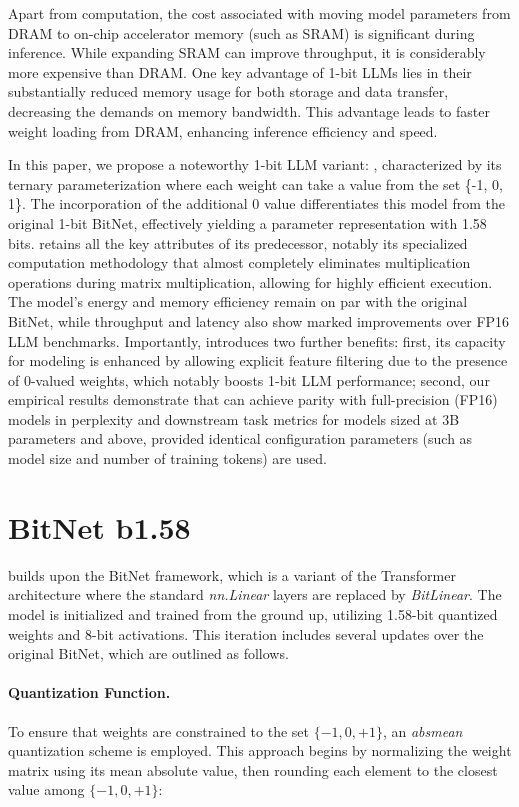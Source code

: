 Apart from computation, the cost associated with moving model parameters from DRAM to on-chip accelerator memory (such as SRAM) is significant during inference. While expanding SRAM can improve throughput, it is considerably more expensive than DRAM. One key advantage of 1-bit LLMs lies in their substantially reduced memory usage for both storage and data transfer, decreasing the demands on memory bandwidth. This advantage leads to faster weight loading from DRAM, enhancing inference efficiency and speed.

In this paper, we propose a noteworthy 1-bit LLM variant: \textbf{}, characterized by its ternary parameterization where each weight can take a value from the set \{-1, 0, 1\}. The incorporation of the additional 0 value differentiates this model from the original 1-bit BitNet, effectively yielding a parameter representation with 1.58 bits.  retains all the key attributes of its predecessor, notably its specialized computation methodology that almost completely eliminates multiplication operations during matrix multiplication, allowing for highly efficient execution. The model’s energy and memory efficiency remain on par with the original BitNet, while throughput and latency also show marked improvements over FP16 LLM benchmarks. Importantly,  introduces two further benefits: first, its capacity for modeling is enhanced by allowing explicit feature filtering due to the presence of 0-valued weights, which notably boosts 1-bit LLM performance; second, our empirical results demonstrate that  can achieve parity with full-precision (FP16) models in perplexity and downstream task metrics for models sized at 3B parameters and above, provided identical configuration parameters (such as model size and number of training tokens) are used.

\section{BitNet b1.58}

 builds upon the BitNet framework, which is a variant of the Transformer architecture where the standard \emph{nn.Linear} layers are replaced by \emph{BitLinear}. The model is initialized and trained from the ground up, utilizing 1.58-bit quantized weights and 8-bit activations. This iteration includes several updates over the original BitNet, which are outlined as follows.

\paragraph{Quantization Function.} To ensure that weights are constrained to the set $\{-1, 0, +1\}$, an \emph{absmean} quantization scheme is employed. This approach begins by normalizing the weight matrix using its mean absolute value, then rounding each element to the closest value among $\{-1, 0, +1\}$:

